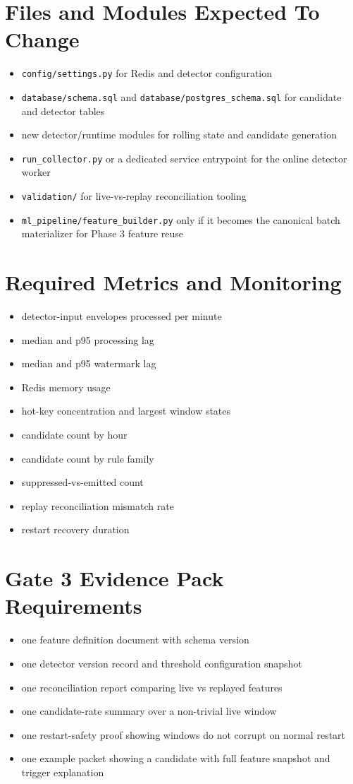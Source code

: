 \documentclass{article}
\begin{document}
\section*{Files and Modules Expected To Change}
\begin{itemize}
\item \texttt{config/settings.py} for Redis and detector configuration
\item \texttt{database/schema.sql} and \texttt{database/postgres\_schema.sql} for candidate and detector tables
\item new detector/runtime modules for rolling state and candidate generation
\item \texttt{run\_collector.py} or a dedicated service entrypoint for the online detector worker
\item \texttt{validation/} for live-vs-replay reconciliation tooling
\item \texttt{ml\_pipeline/feature\_builder.py} only if it becomes the canonical batch materializer for Phase 3 feature reuse
\end{itemize}

\section*{Required Metrics and Monitoring}
\begin{itemize}
\item detector-input envelopes processed per minute
\item median and p95 processing lag
\item median and p95 watermark lag
\item Redis memory usage
\item hot-key concentration and largest window states
\item candidate count by hour
\item candidate count by rule family
\item suppressed-vs-emitted count
\item replay reconciliation mismatch rate
\item restart recovery duration
\end{itemize}

\section*{Gate 3 Evidence Pack Requirements}
\begin{itemize}
\item one feature definition document with schema version
\item one detector version record and threshold configuration snapshot
\item one reconciliation report comparing live vs replayed features
\item one candidate-rate summary over a non-trivial live window
\item one restart-safety proof showing windows do not corrupt on normal restart
\item one example packet showing a candidate with full feature snapshot and trigger explanation
\end{itemize}
\end{document}
